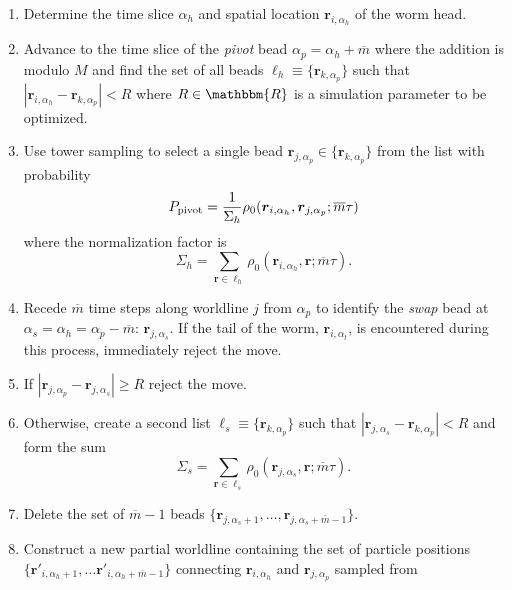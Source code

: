 \documentclass[prb,aps,amssym,nofootinbib,floatfix,notitlepage]{revtex4-1}
\renewcommand{\vec}[1]{\boldsymbol{#1}}
\begin{document}
\begin{enumerate}
    \item Determine the time slice $\alpha_h$ and spatial location
        $\vec{r}_{i,\alpha_h}$ of the worm head.
    \item Advance to the time slice of the \emph{pivot} bead $\alpha_p =
        \alpha_h + \overline{m}$ where the addition is modulo $M$ and find the
        set of all beads $\ell_h \equiv \{\vec{r}_{k,\alpha_p}\}$ such that
        $|\vec{r}_{i,\alpha_h} - \vec{r}_{k,\alpha_p}| < R$ where $R \in
        \mathbbm{R}$ is a simulation parameter to be optimized.
\item Use tower sampling to select a single bead $\vec{r}_{j,\alpha_p} \in
    \{\vec{r}_{k,\alpha_p}\}$ from the list with probability
\begin{equation}
    P_{\rm pivot} = \frac{1}{\Sigma_h}
    \rho_0(\vec{r}_{i,\alpha_h},\vec{r}_{j,\alpha_p};\overline{m}\tau)
\end{equation}
%
where the normalization factor is
%
\begin{equation}
\Sigma_h = \sum_{\vec{r}\in\ell_h} 
    \rho_0(\vec{r}_{i,\alpha_h},\vec{r};\overline{m}\tau).
\end{equation}
%
\item Recede $\overline{m}$ time steps along worldline $j$ from $\alpha_p$ to
    identify the \emph{swap} bead at $\alpha_s = \alpha_h =
    \alpha_p-\overline{m}$: $\vec{r}_{j,\alpha_s}$. If the tail of the worm,
    $\vec{r}_{i,\alpha_t}$, is encountered during this process, immediately reject the move.
\item If $|\vec{r}_{j,\alpha_p} - \vec{r}_{j,\alpha_s}| \ge R$ reject the move.
\item Otherwise, create a second list $\ell_s \equiv \{\vec{r}_{k,\alpha_p}\}$ such
    that $|\vec{r}_{j,\alpha_s} - \vec{r}_{k,\alpha_p}| < R$ and form the sum
\begin{equation}
\Sigma_s = \sum_{\vec{r}\in\ell_s} 
    \rho_0(\vec{r}_{j,\alpha_s},\vec{r};\overline{m}\tau).
\end{equation}
%
\item Delete the set of $\overline{m}-1$ beads
    $\{\vec{r}_{j,\alpha_s+1},\ldots,\vec{r}_{j,\alpha_s+\overline{m}-1} \}$.
\item Construct a new partial worldline containing the set of particle
    positions $\{\vec{r}'_{i,\alpha_h+1},\ldots
    \vec{r}'_{i,\alpha_h+\overline{m}-1}\}$
    connecting $\vec{r}_{i,\alpha_h}$ and $\vec{r}_{j,\alpha_p}$ sampled from

\end{enumerate}
\end{document}
